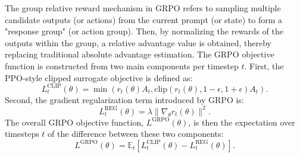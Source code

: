 The group relative reward mechanism in GRPO refers to sampling multiple candidate outputs (or actions) from the current prompt (or state) to form a "response group" (or action group). Then, by normalizing the rewards of the outputs within the group, a relative advantage value is obtained, thereby replacing traditional absolute advantage estimation. The GRPO objective function is constructed from two main components per timestep $t$.
First, the PPO-style clipped surrogate objective is defined as:
\begin{equation} \label{eq:grpo_clip}
L^{\text{CLIP}}_t(\theta) = \min(r_t(\theta)A_t, \text{clip}(r_t(\theta), 1-\epsilon, 1+\epsilon)A_t).
\end{equation}
Second, the gradient regularization term introduced by GRPO is:
\begin{equation} \label{eq:grpo_reg}
L^{\text{REG}}_t(\theta) = \lambda \|\nabla_\theta r_t(\theta)\|^2.
\end{equation}
The overall GRPO objective function, $L^{\text{GRPO}}(\theta)$, is then the expectation over timesteps $t$ of the difference between these two components:
\begin{equation} \label{eq:grpo_objective_final}
L^{\text{GRPO}}(\theta) = \mathbb{E}_t [L^{\text{CLIP}}_t(\theta) - L^{\text{REG}}_t(\theta)].
\end{equation}

